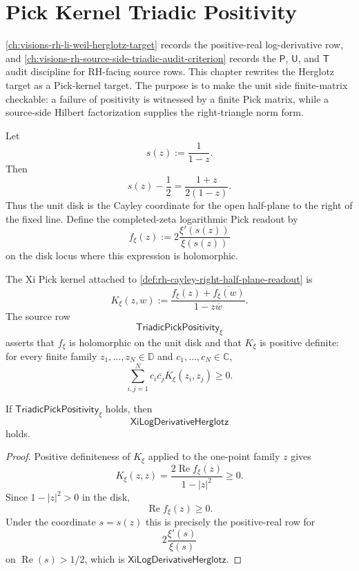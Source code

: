 \chapter{Pick Kernel Triadic Positivity}
\label{ch:visions-rh-pick-kernel-triadic-positivity}

\autoref{ch:visions-rh-li-weil-herglotz-target} records the positive-real
log-derivative row, and
\autoref{ch:visions-rh-source-side-triadic-audit-criterion} records the
$\mathsf P$, $\mathsf U$, and $\mathsf T$ audit discipline for
RH-facing source rows.  This chapter rewrites the Herglotz target as a
Pick-kernel target.  The purpose is to make the unit side finite-matrix
checkable: a failure of positivity is witnessed by a finite Pick matrix,
while a source-side Hilbert factorization supplies the right-triangle
norm form.

\begin{definition}
\label{def:rh-cayley-right-half-plane-readout}
Let
$$
s(z):=\frac{1}{1-z}.
$$
Then
$$
s(z)-\frac12
=
\frac{1+z}{2(1-z)}.
$$
Thus the unit disk is the Cayley coordinate for the open half-plane to
the right of the fixed line.  Define the completed-zeta logarithmic
Pick readout by
$$
f_{\xi}(z)
:=
2\frac{\xi'(s(z))}{\xi(s(z))}
$$
on the disk locus where this expression is holomorphic.
\end{definition}

\begin{definition}
\label{def:rh-xi-pick-kernel}
The Xi Pick kernel attached to
\autoref{def:rh-cayley-right-half-plane-readout} is
$$
K_{\xi}(z,w)
:=
\frac{f_{\xi}(z)+\overline{f_{\xi}(w)}}{1-z\overline w}.
$$
The source row
$$
\mathsf{TriadicPickPositivity}_{\xi}
$$
asserts that $f_{\xi}$ is holomorphic on the unit disk and that
$K_{\xi}$ is positive definite: for every finite family
$z_1,\ldots,z_N\in\mathbb D$ and $c_1,\ldots,c_N\in\mathbb C$,
$$
\sum_{i,j=1}^{N}
c_i\overline{c_j}K_{\xi}(z_i,z_j)\ge0.
$$
\end{definition}

\begin{theorem}
\label{thm:rh-pick-positivity-gives-herglotz-row}
If $\mathsf{TriadicPickPositivity}_{\xi}$ holds, then
$$
\mathsf{XiLogDerivativeHerglotz}
$$
holds.
\end{theorem}

\begin{proof}
Positive definiteness of $K_{\xi}$ applied to the one-point family
$z$ gives
$$
K_{\xi}(z,z)
=
\frac{2\operatorname{Re}f_{\xi}(z)}{1-|z|^2}
\ge0.
$$
Since $1-|z|^2>0$ in the disk,
$$
\operatorname{Re}f_{\xi}(z)\ge0.
$$
Under the coordinate $s=s(z)$ this is precisely the positive-real row
for
$$
2\frac{\xi'(s)}{\xi(s)}
$$
on $\operatorname{Re}(s)>1/2$, which is
$\mathsf{XiLogDerivativeHerglotz}$.
\end{proof}

